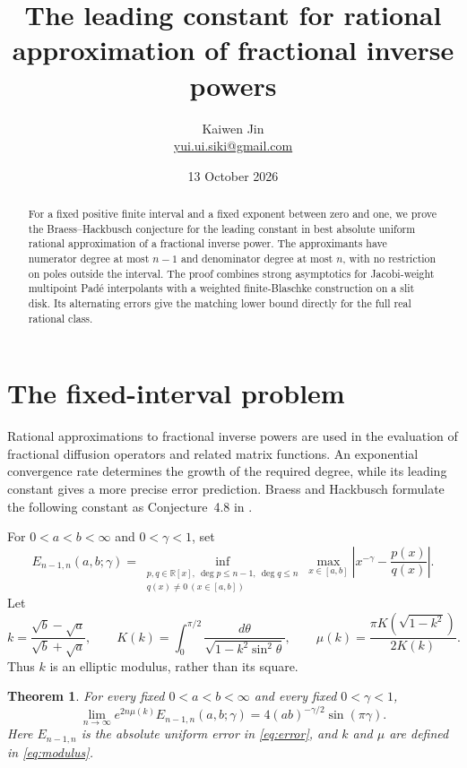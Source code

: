 \documentclass[11pt]{article}
\title{The leading constant for rational approximation of fractional inverse powers}
\author{Kaiwen Jin\\\small\href{mailto:yui.ui.siki@gmail.com}{yui.ui.siki@gmail.com}}
\date{13 October 2026}
\newtheorem{theorem}{Theorem}
\newcommand{\R}{\mathbb R}
\begin{document}
\maketitle
\begin{abstract}
For a fixed positive finite interval and a fixed exponent between zero and one,
we prove the Braess--Hackbusch conjecture for the leading constant in best
absolute uniform rational approximation of a fractional inverse power.
The approximants have numerator degree at most $n-1$ and denominator degree
at most $n$, with no restriction on poles outside the interval.
The proof combines strong asymptotics for Jacobi-weight multipoint Pad\'e
interpolants with a weighted finite-Blaschke construction on a slit disk.
Its alternating errors give the matching lower bound directly for the full
real rational class.
\end{abstract}

\section{The fixed-interval problem}

Rational approximations to fractional inverse powers are used in the
evaluation of fractional diffusion operators and related matrix functions.
An exponential convergence rate determines the growth of the required degree,
while its leading constant gives a more precise error prediction.
Braess and Hackbusch formulate the following constant as
Conjecture~4.8 in \cite{BH}.

For $0<a<b<\infty$ and $0<\gamma<1$, set
\begin{equation}\label{eq:error}
 E_{n-1,n}(a,b;\gamma)
 =\inf_{\substack{p,q\in\R[x],\ \deg p\le n-1,\ \deg q\le n\\
                  q(x)\ne0\ (x\in[a,b])}}
       \max_{x\in[a,b]}\left|x^{-\gamma}-\frac{p(x)}{q(x)}\right|.
\end{equation}
Let
\begin{equation}\label{eq:modulus}
 k=\frac{\sqrt b-\sqrt a}{\sqrt b+\sqrt a},\qquad
 K(k)=\int_0^{\pi/2}\frac{d\theta}{\sqrt{1-k^2\sin^2\theta}},\qquad
 \mu(k)=\frac{\pi K(\sqrt{1-k^2})}{2K(k)}.
\end{equation}
Thus $k$ is an elliptic modulus, rather than its square.

\begin{theorem}\label{thm:main}
For every fixed $0<a<b<\infty$ and every fixed $0<\gamma<1$,
\begin{equation}\label{eq:main}
 \lim_{n\to\infty}e^{2n\mu(k)} E_{n-1,n}(a,b;\gamma)
 =4(ab)^{-\gamma/2}\sin(\pi\gamma).
\end{equation}
Here $E_{n-1,n}$ is the absolute uniform error in \eqref{eq:error}, and
$k$ and $\mu$ are defined in \eqref{eq:modulus}.
\end{theorem}
\end{document}
